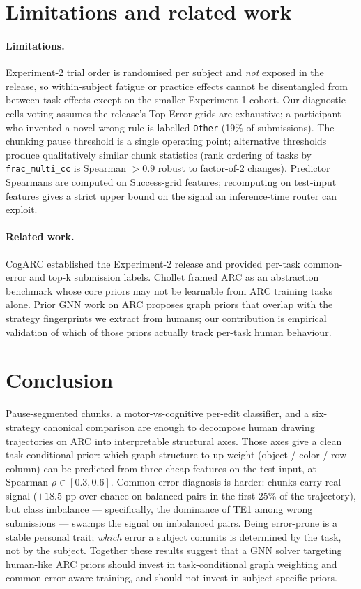 \documentclass[11pt]{article}
\begin{document}
\section{Limitations and related work}

\paragraph{Limitations.}
Experiment-2 trial order is randomised per subject and \emph{not}
exposed in the release, so within-subject fatigue or practice
effects cannot be disentangled from between-task effects except on
the smaller Experiment-1 cohort. Our diagnostic-cells voting assumes
the release's Top-Error grids are exhaustive; a participant who
invented a novel wrong rule is labelled \texttt{Other} (19\% of
submissions). The chunking pause threshold is a single operating
point; alternative thresholds produce qualitatively similar chunk
statistics (rank ordering of tasks by \texttt{frac\_multi\_cc} is
Spearman $>0.9$ robust to factor-of-2 changes). Predictor Spearmans
are computed on Success-grid features; recomputing on test-input
features gives a strict upper bound on the signal an inference-time
router can exploit.

\paragraph{Related work.}
CogARC \cite{cogarc2024} established the Experiment-2 release and
provided per-task common-error and top-k submission labels.
Chollet \cite{chollet2019measure} framed ARC as an abstraction
benchmark whose core priors may not be learnable from ARC training
tasks alone. Prior GNN work on ARC
\cite{arcgnn2023,object-centric2024} proposes graph priors that
overlap with the strategy fingerprints we extract from humans; our
contribution is empirical validation of which of those priors
actually track per-task human behaviour.


\section{Conclusion}

Pause-segmented chunks, a motor-vs-cognitive per-edit classifier,
and a six-strategy canonical comparison are enough to decompose
human drawing trajectories on ARC into interpretable structural
axes. Those axes give a clean task-conditional prior: which graph
structure to up-weight (object / color / row-column) can be
predicted from three cheap features on the test input, at Spearman
$\rho \in [0.3, 0.6]$. Common-error diagnosis is harder: chunks
carry real signal ($+18.5$ pp over chance on balanced pairs in the
first 25\% of the trajectory), but class imbalance --- specifically,
the dominance of TE1 among wrong submissions --- swamps the signal
on imbalanced pairs. Being error-prone is a stable personal trait;
\emph{which} error a subject commits is determined by the task,
not by the subject. Together these results suggest that a GNN solver
targeting human-like ARC priors should invest in task-conditional
graph weighting and common-error-aware training, and should not
invest in subject-specific priors.
\end{document}
